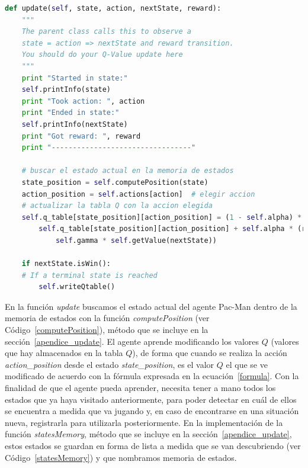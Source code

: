 \documentclass[11pt]{exam}
\begin{document}
\begin{lstlisting}[caption={Función update.}, label={update}, language=python, basicstyle=\footnotesize]
def update(self, state, action, nextState, reward):
	"""
	The parent class calls this to observe a
	state = action => nextState and reward transition.
	You should do your Q-Value update here
	"""	
	print "Started in state:"
	self.printInfo(state)
	print "Took action: ", action
	print "Ended in state:"
	self.printInfo(nextState)
	print "Got reward: ", reward
	print "---------------------------------"

	# buscar el estado actual en la memoria de estados
	state_position = self.computePosition(state)
	action_position = self.actions[action]  # elegir accion
	# actualizar la tabla Q con la accion elegida
	self.q_table[state_position][action_position] = (1 - self.alpha) * 
		self.q_table[state_position][action_position] + self.alpha * (reward + 
			self.gamma * self.getValue(nextState))

	if nextState.isWin():
	# If a terminal state is reached
		self.writeQtable()
\end{lstlisting}

En la función \textit{update} buscamos el estado actual del agente Pac-Man dentro de la memoria de estados con la función \textit{computePosition} (ver Código~\ref{computePosition}), método que se incluye en la sección~\ref{apendice_update}. El agente aprende modificando los valores $Q$ (valores que hay almacenados en la tabla $Q$), de forma que cuando se realiza la acción \textit{action\_position} desde el estado \textit{state\_position}, es el valor $Q$ el que se ve modificado de acuerdo con la fórmula expresada en la ecuación~\ref{formula}. Con la finalidad de que el agente pueda aprender, necesita tener a mano todos los estados que ya haya visitado anteriormente, para poder detectar en cuál de ellos se encuentra a medida que va jugando y, en caso de encontrarse en una situación nueva, registrarla para utilizarla posteriormente. En la implementación de la función \textit{statesMemory}, método que se incluye en la sección~\ref{apendice_update}, estos estados se guardan en forma de lista a medida que se van descubriendo (ver Código~\ref{statesMemory}) y que nombramos memoria de estados.
\end{document}
